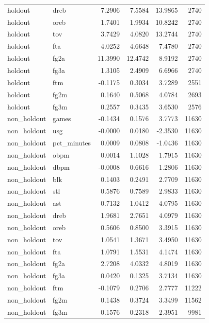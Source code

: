 \begin{table}
\begin{tabular}{llrrrr}
holdout & dreb & 7.2906 & 7.5584 & 13.9865 & 2740 \\
holdout & oreb & 1.7401 & 1.9934 & 10.8242 & 2740 \\
holdout & tov & 3.7429 & 4.0820 & 13.2744 & 2740 \\
holdout & fta & 4.0252 & 4.6648 & 7.4780 & 2740 \\
holdout & fg2a & 11.3990 & 12.4742 & 8.9192 & 2740 \\
holdout & fg3a & 1.3105 & 2.4909 & 6.6966 & 2740 \\
holdout & ftm & -0.1175 & 0.3034 & 3.7289 & 2551 \\
holdout & fg2m & 0.1640 & 0.5068 & 4.0784 & 2693 \\
holdout & fg3m & 0.2557 & 0.3435 & 3.6530 & 2576 \\
non\_holdout & games & -0.1434 & 0.1576 & 3.7773 & 11630 \\
non\_holdout & usg & -0.0000 & 0.0180 & -2.3530 & 11630 \\
non\_holdout & pct\_minutes & 0.0009 & 0.0808 & -1.0436 & 11630 \\
non\_holdout & obpm & 0.0014 & 1.1028 & 1.7915 & 11630 \\
non\_holdout & dbpm & -0.0008 & 0.6616 & 1.2806 & 11630 \\
non\_holdout & blk & 0.1403 & 0.2491 & 2.7709 & 11630 \\
non\_holdout & stl & 0.5876 & 0.7589 & 2.9833 & 11630 \\
non\_holdout & ast & 0.7132 & 1.0412 & 4.0795 & 11630 \\
non\_holdout & dreb & 1.9681 & 2.7651 & 4.0979 & 11630 \\
non\_holdout & oreb & 0.5606 & 0.8500 & 3.3915 & 11630 \\
non\_holdout & tov & 1.0541 & 1.3671 & 3.4950 & 11630 \\
non\_holdout & fta & 1.0791 & 1.5531 & 4.1474 & 11630 \\
non\_holdout & fg2a & 2.7208 & 4.0332 & 4.8019 & 11630 \\
non\_holdout & fg3a & 0.0420 & 0.1325 & 3.7134 & 11630 \\
non\_holdout & ftm & -0.1079 & 0.2706 & 2.7777 & 11222 \\
non\_holdout & fg2m & 0.1438 & 0.3724 & 3.3499 & 11562 \\
non\_holdout & fg3m & 0.1576 & 0.2318 & 2.3951 & 9981 \\
\bottomrule
\end{tabular}
\end{table}
